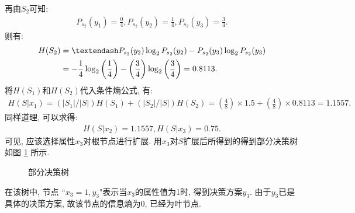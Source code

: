 再由$S_2$可知:
\begin{align}
  P_{s_2} (y_1)=\frac 0 4, P_{s_2} (y_2)=\frac 1 4, P_{s_2} (y_3)=\frac 3 4.
\end{align}
则有:
\begin{align}
    H(S_2)&=– P_{s_2} (y_2)\log_2 P_{s_2} (y_2 )- P_{s_2} (y_3)\log_2 P_{s_2} (y_3)\notag\\
          &=-\frac 1 4\log_2\left (\frac 1 4\right)- \left (\frac 3 4\right)\log_2\left (\frac 3 4\right) =0.8113.
\end{align}
将$H (S_1)$和$H (S_2)$代入条件熵公式, 有:
\begin{align}
    H(S|x_1)= (|S_1|/|S|)H (S_1)+ (|S_2|/|S|)H (S_2)=\left (\frac 4 8\right)\times 1.5+\left (\frac 4 8\right)\times 0.8113 =1.1557.
\end{align}
同样道理, 可以求得:
\begin{align}
    H(S|x_2)=1.1557, H(S|x_3)=0.75.
\end{align}
可见, 应该选择属性$x_3$对根节点进行扩展. 用$x_3$对$S$扩展后所得到的得到部分决策树如图 \ref{bufenjueceshu2019112901} 所示.
\begin{figure}[H]
\begin{center}
\caption{部分决策树}
\label{bufenjueceshu2019112901}
\end{center}
\end{figure}
在该树中, 节点 ``$x_3=1, y_3$"表示当$x_3$的属性值为1时, 得到决策方案$y_3$. 由于$y_3$已是具体的决策方案, 故该节点的信息熵为0, 已经为叶节点.

